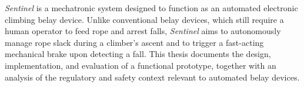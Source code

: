 \documentclass[british]{ntnuthesis}
\begin{document}
\emph{Sentinel} is a mechatronic system designed to function as an automated
electronic climbing belay device. Unlike conventional belay devices, which
still require a human operator to feed rope and arrest falls, \emph{Sentinel} aims
to autonomously manage rope slack during a climber's ascent and to trigger
a fast-acting mechanical brake upon detecting a fall. This thesis documents 
the design, implementation, and evaluation of a functional prototype, together
with an analysis of the regulatory and safety context relevant to automated belay devices.

\tableofcontents











\chapter*{\bibname}
\label{ch:references}
\nocite{img_adam_ondra_dawn_wall,petzl_belay_slack,petzl_belay_device}
\printbibliography[heading=none]
\end{document}
